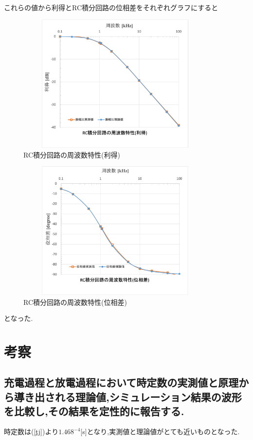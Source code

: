 \documentclass[a4j,10pt,dvipdfmx]{jarticle}
\begin{document}
  これらの値から利得とRC積分回路の位相差をそれぞれグラフにすると
  \begin{figure}[H]
    \begin{center}
    \includegraphics[height=7cm,width=10cm]{3-1.png}
    \caption{RC積分回路の周波数特性(利得)}
    \label{res3-1}
  \end{center}
  \end{figure}
  \begin{figure}[H]
    \begin{center}
    \includegraphics[height=7cm,width=10cm]{3-2.png}
    \caption{RC積分回路の周波数特性(位相差)}
    \label{res3-2}
  \end{center}
  \end{figure}
となった.
\section{考察}
\subsection{充電過程と放電過程において時定数の実測値と原理から導き出される理論値,シミュレーション結果の波形を比較し,その結果を定性的に報告する.}
時定数は(\ref{tj})より$1.468^{-4}$[s]となり,実測値と理論値がとても近いものとなった.
\end{document}
